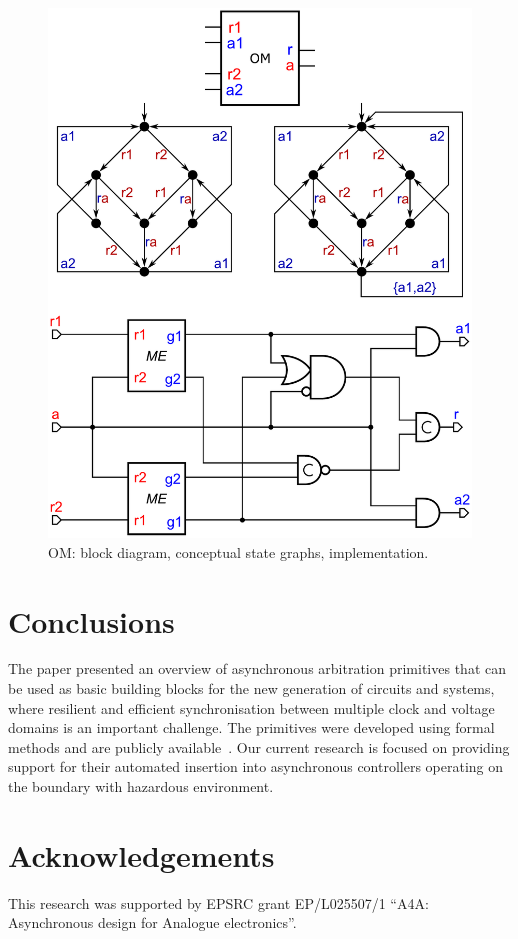 \documentclass[conference]{IEEEtran}
\begin{document}
\begin{figure}
\begin{center}
    \vspace{-1mm}
    \includegraphics[scale=0.32]{fig/OM.pdf}
    \caption{\textsf{OM}: block diagram, conceptual state graphs,
    implementation.}
    \label{fig:om}
    \vspace{-6.5mm}
\end{center}
\end{figure}

\section{Conclusions}

The paper presented an overview of asynchronous arbitration primitives that can
be used as basic building blocks for the new generation of circuits and systems,
where resilient and efficient synchronisation between multiple clock and voltage
domains is an important challenge.
The primitives were developed using formal methods and are publicly
available~\cite{Arbitration_primitives_github}. Our current research is focused
on providing support for their automated insertion into asynchronous controllers
operating on the boundary with hazardous environment.


\section*{Acknowledgements}
\vspace{-0.5mm}

This research was supported by EPSRC grant EP/L025507/1 ``A4A: Asynchronous design
for Analogue electronics''.



\end{document}
